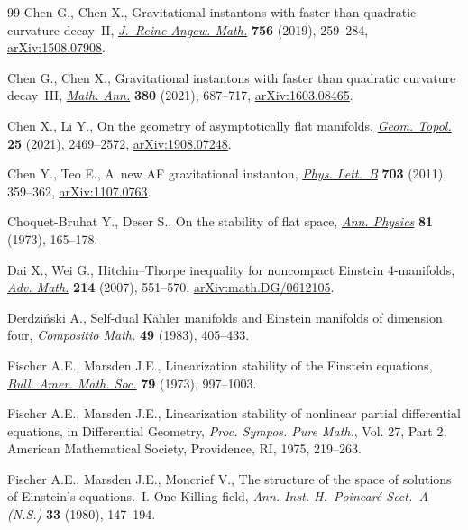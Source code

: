 \documentclass[10pt,a4paper]{amsart}
\numberwithin{equation}{section}
\begin{document}
\begin{thebibliography}{99}
Chen G., Chen X., Gravitational instantons with faster than quadratic curvature
 decay~{II}, \href{https://doi.org/10.1515/crelle-2017-0026}{\textit{J.~Reine Angew. Math.}} \textbf{756} (2019), 259--284,
 \href{https://arxiv.org/abs/1508.07908}{arXiv:1508.07908}.

Chen G., Chen X., Gravitational instantons with faster than quadratic curvature
 decay~{III}, \href{https://doi.org/10.1007/s00208-020-01984-9}{\textit{Math. Ann.}} \textbf{380} (2021), 687--717,
 \href{https://arxiv.org/abs/1603.08465}{arXiv:1603.08465}.

Chen X., Li Y., On the geometry of asymptotically flat manifolds, \href{https://doi.org/10.2140/gt.2021.25.2469}{\textit{Geom.
 Topol.}} \textbf{25} (2021), 2469--2572, \href{https://arxiv.org/abs/1908.07248}{arXiv:1908.07248}.

Chen Y., Teo E., A~new {AF} gravitational instanton, \href{https://doi.org/10.1016/j.physletb.2011.07.076}{\textit{Phys. Lett.~B}}
 \textbf{703} (2011), 359--362, \href{https://arxiv.org/abs/1107.0763}{arXiv:1107.0763}.

Choquet-Bruhat Y., Deser S., On the stability of flat space, \href{https://doi.org/10.1016/0003-4916(73)90484-3}{\textit{Ann.
 Physics}} \textbf{81} (1973), 165--178.

Dai X., Wei G., Hitchin--{T}horpe inequality for noncompact {E}instein
 4-manifolds, \href{https://doi.org/10.1016/j.aim.2007.02.010}{\textit{Adv. Math.}} \textbf{214} (2007), 551--570,
 \href{https://arxiv.org/abs/math.DG/0612105}{arXiv:math.DG/0612105}.

Derdzi\'nski A., Self-dual {K}\"ahler manifolds and {E}instein manifolds of
 dimension four, \textit{Compositio Math.} \textbf{49} (1983), 405--433.

Fischer A.E., Marsden J.E., Linearization stability of the {E}instein
 equations, \href{https://doi.org/10.1090/S0002-9904-1973-13299-9}{\textit{Bull. Amer. Math. Soc.}} \textbf{79} (1973), 997--1003.

Fischer A.E., Marsden J.E., Linearization stability of nonlinear partial
 differential equations, in Differential Geometry, \textit{Proc. Sympos. Pure Math.}, Vol. 27, Part 2, American
 Mathematical Society, Providence, RI, 1975, 219--263.

Fischer A.E., Marsden J.E., Moncrief V., The structure of the space of
 solutions of {E}instein's equations.~{I}. {O}ne {K}illing field, \textit{Ann.
 Inst. H.~Poincar\'e Sect.~A (N.S.)} \textbf{33} (1980), 147--194.


\end{thebibliography}
\end{document}
